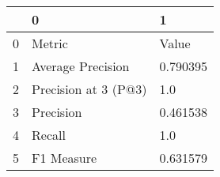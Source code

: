 \begin{tabular}{lll}
\toprule
{} &                     0 &         1 \\
\midrule
0 &                Metric &     Value \\
1 &     Average Precision &  0.790395 \\
2 &  Precision at 3 (P@3) &       1.0 \\
3 &             Precision &  0.461538 \\
4 &                Recall &       1.0 \\
5 &            F1 Measure &  0.631579 \\
\bottomrule
\end{tabular}
